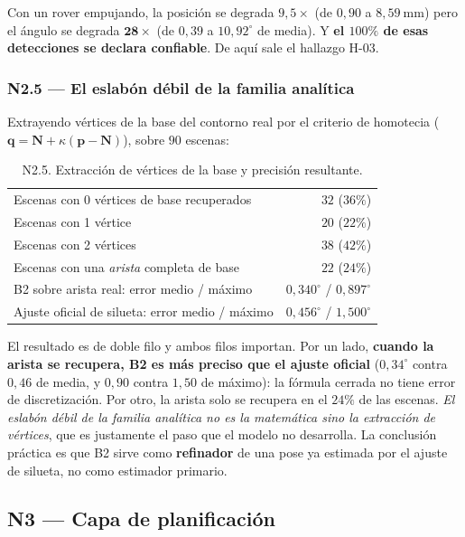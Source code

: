 \documentclass[11pt,a4paper]{article}
\newcommand{\grados}{^{\circ}}
\begin{document}
Con un rover empujando, la posición se degrada $9{,}5\times$ (de $0{,}90$ a
$8{,}59\ \mathrm{mm}$) pero el ángulo se degrada $\mathbf{28\times}$ (de $0{,}39$ a
$10{,}92\grados$ de media). Y \textbf{el $100\%$ de esas detecciones se declara
confiable}. De aquí sale el hallazgo H-03.

\subsubsection{N2.5 --- El eslabón débil de la familia analítica}

Extrayendo vértices de la base del contorno real por el criterio de homotecia
($\mathbf q = \mathbf N + \kappa(\mathbf p - \mathbf N)$), sobre $90$ escenas:

\begin{table}[htbp]
\centering
\small
\caption{N2.5. Extracción de vértices de la base y precisión resultante.}
\begin{tabular}{lr}
\toprule
Escenas con 0 vértices de base recuperados & $32$ ($36\%$) \\
Escenas con 1 vértice & $20$ ($22\%$) \\
Escenas con 2 vértices & $38$ ($42\%$) \\
Escenas con una \emph{arista} completa de base & $22$ ($24\%$) \\
\midrule
B2 sobre arista real: error medio / máximo & $0{,}340\grados$ / $0{,}897\grados$ \\
Ajuste oficial de silueta: error medio / máximo & $0{,}456\grados$ / $1{,}500\grados$ \\
\bottomrule
\end{tabular}
\end{table}

El resultado es de doble filo y ambos filos importan. Por un lado, \textbf{cuando la
arista se recupera, B2 es más preciso que el ajuste oficial} ($0{,}34\grados$ contra
$0{,}46$ de media, y $0{,}90$ contra $1{,}50$ de máximo): la fórmula cerrada no tiene
error de discretización. Por otro, la arista solo se recupera en el $24\%$ de las
escenas. \emph{El eslabón débil de la familia analítica no es la matemática sino la
extracción de vértices}, que es justamente el paso que el modelo no desarrolla. La
conclusión práctica es que B2 sirve como \textbf{refinador} de una pose ya estimada por
el ajuste de silueta, no como estimador primario.

\subsection{N3 --- Capa de planificación}
\end{document}
